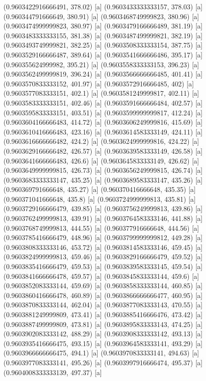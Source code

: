 {{{(0.9603422916666491, 378.02) [a] 
(0.9603433333333157, 378.03) [a] 
(0.960344791666649, 380.91) [a] 
(0.9603468749999823, 380.96) [a] 
(0.9603474999999823, 380.97) [a] 
(0.9603479166666489, 381.19) [a] 
(0.9603483333333155, 381.38) [a] 
(0.9603487499999821, 382.19) [a] 
(0.9603493749999821, 382.25) [a] 
(0.9603508333333154, 387.75) [a] 
(0.9603529166666487, 389.64) [a] 
(0.9603541666666486, 395.17) [a] 
(0.960355624999982, 395.21) [a] 
(0.9603558333333153, 396.23) [a] 
(0.9603562499999819, 396.24) [a] 
(0.9603566666666485, 401.41) [a] 
(0.9603570833333152, 401.97) [a] 
(0.9603572916666485, 402) [a] 
(0.9603577083333151, 402.1) [a] 
(0.9603581249999817, 402.11) [a] 
(0.9603583333333151, 402.46) [a] 
(0.9603591666666484, 402.57) [a] 
(0.9603595833333151, 403.51) [a] 
(0.9603599999999817, 412.24) [a] 
(0.9603604166666483, 414.72) [a] 
(0.9603606249999816, 415.69) [a] 
(0.9603610416666483, 423.16) [a] 
(0.9603614583333149, 424.11) [a] 
(0.9603616666666482, 424.2) [a] 
(0.9603624999999816, 424.22) [a] 
(0.9603629166666482, 426.57) [a] 
(0.9603639583333149, 426.58) [a] 
(0.9603641666666483, 426.6) [a] 
(0.9603645833333149, 426.62) [a] 
(0.9603649999999815, 426.73) [a] 
(0.9603656249999815, 426.74) [a] 
(0.9603683333333147, 435.25) [a] 
(0.9603689583333147, 435.26) [a] 
(0.960369791666648, 435.27) [a] 
(0.960370416666648, 435.35) [a] 
(0.960371041666648, 435.8) [a] 
(0.9603724999999813, 435.81) [a] 
(0.9603729166666479, 439.85) [a] 
(0.9603756249999813, 439.86) [a] 
(0.9603762499999813, 439.91) [a] 
(0.9603764583333146, 441.88) [a] 
(0.9603768749999813, 444.55) [a] 
(0.960377916666648, 444.56) [a] 
(0.9603785416666479, 448.96) [a] 
(0.9603799999999812, 449.28) [a] 
(0.9603808333333146, 453.72) [a] 
(0.9603814583333146, 459.45) [a] 
(0.9603824999999813, 459.46) [a] 
(0.9603829166666479, 459.52) [a] 
(0.9603835416666479, 459.53) [a] 
(0.9603839583333145, 459.54) [a] 
(0.9603841666666478, 459.57) [a] 
(0.9603845833333144, 459.6) [a] 
(0.9603852083333144, 459.69) [a] 
(0.9603858333333144, 460.85) [a] 
(0.9603860416666478, 460.89) [a] 
(0.9603866666666477, 460.95) [a] 
(0.9603870833333144, 462.04) [a] 
(0.9603877083333143, 470.55) [a] 
(0.9603881249999809, 473.41) [a] 
(0.9603885416666476, 473.42) [a] 
(0.9603887499999809, 473.81) [a] 
(0.9603895833333143, 474.25) [a] 
(0.9603902083333142, 488.29) [a] 
(0.9603908333333142, 493.13) [a] 
(0.9603935416666475, 493.15) [a] 
(0.9603964583333141, 493.29) [a] 
(0.9603966666666475, 494.1) [a] 
(0.9603970833333141, 494.63) [a] 
(0.9603977083333141, 495.26) [a] 
(0.9603997916666474, 495.37) [a] 
(0.9604008333333139, 497.37) [a] 
}}}
